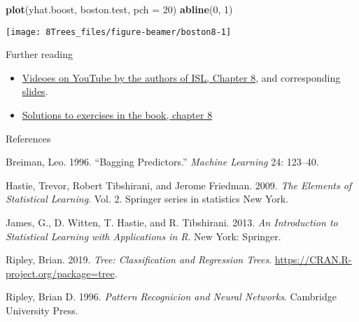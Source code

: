 \documentclass[10pt,ignorenonframetext,]{beamer}
\newenvironment{Shaded}{\begin{snugshade}}{\end{snugshade}}
\newcommand{\DataTypeTok}[1]{\textcolor[rgb]{0.13,0.29,0.53}{#1}}
\newcommand{\DecValTok}[1]{\textcolor[rgb]{0.00,0.00,0.81}{#1}}
\newcommand{\KeywordTok}[1]{\textcolor[rgb]{0.13,0.29,0.53}{\textbf{#1}}}
\newcommand{\NormalTok}[1]{#1}
\begin{document}
\begin{frame}[fragile]

\scriptsize

\begin{Shaded}
\begin{Highlighting}[]
\KeywordTok{plot}\NormalTok{(yhat.boost, boston.test, }\DataTypeTok{pch =} \DecValTok{20}\NormalTok{)}
\KeywordTok{abline}\NormalTok{(}\DecValTok{0}\NormalTok{, }\DecValTok{1}\NormalTok{)}
\end{Highlighting}
\end{Shaded}

\begin{center}\texttt{[image: 8Trees\_files/figure-beamer/boston8-1]} \end{center}

\end{frame}

\begin{frame}{Further reading}
\protect\hypertarget{further-reading}{}

\begin{itemize}
\item
  \href{https://www.youtube.com/playlist?list=PL5-da3qGB5IB23TLuA8ZgVGC8hV8ZAdGh}{Videoes
  on YouTube by the authors of ISL, Chapter 8}, and corresponding
  \href{https://lagunita.stanford.edu/c4x/HumanitiesScience/StatLearning/asset/trees.pdf}{slides}.
\item
  \href{https://rstudio-pubs-static.s3.amazonaws.com/65564_925dfde884e14ef9b5735eddd16c263e.html}{Solutions
  to exercises in the book, chapter 8}
\end{itemize}

\end{frame}

\begin{frame}{References}
\protect\hypertarget{references}{}

\tiny

\hypertarget{refs}{}
\leavevmode\hypertarget{ref-Breiman1996}{}%
Breiman, Leo. 1996. ``Bagging Predictors.'' \emph{Machine Learning} 24:
123--40.

\leavevmode\hypertarget{ref-hastie_etal2009}{}%
Hastie, Trevor, Robert Tibshirani, and Jerome Friedman. 2009. \emph{The
Elements of Statistical Learning}. Vol. 2. Springer series in statistics
New York.

\leavevmode\hypertarget{ref-james.etal}{}%
James, G., D. Witten, T. Hastie, and R. Tibshirani. 2013. \emph{An
Introduction to Statistical Learning with Applications in R}. New York:
Springer.

\leavevmode\hypertarget{ref-tree2019}{}%
Ripley, Brian. 2019. \emph{Tree: Classification and Regression Trees}.
\url{https://CRAN.R-project.org/package=tree}.

\leavevmode\hypertarget{ref-Ripley}{}%
Ripley, Brian D. 1996. \emph{Pattern Recognicion and Neural Networks}.
Cambridge University Press.

\end{frame}
\end{document}
